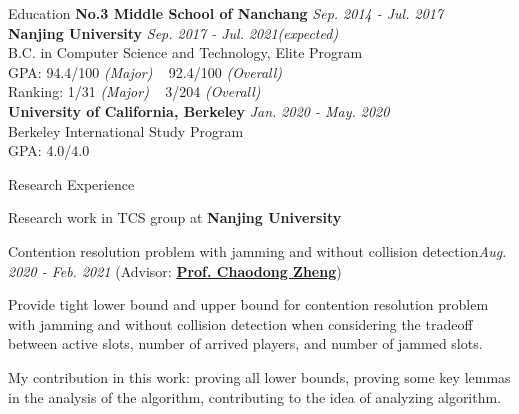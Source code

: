 \documentclass{resume} %
\begin{document}
\vspace{-2pt}
\begin{rSection}{Education}
{\bf No.3 Middle School of Nanchang} \hfill{\em Sep. 2014 - Jul. 2017}\\
{\bf Nanjing University} \hfill {\em Sep. 2017 - Jul. 2021(expected)} \\
B.C. in Computer Science and Technology, Elite Program \\
GPA: 94.4/100 {\em (Major)} ~ 92.4/100 {\em (Overall)}\\
Ranking: 1/31 {\em (Major)} ~ 3/204 {\em (Overall)}\smallskip\\
{\bf University of California, Berkeley} \hfill {\em Jan. 2020 - May. 2020} \\
Berkeley International Study Program
\smallskip\\
GPA: 4.0/4.0
\end{rSection}

\begin{rSection}{Research Experience}

{\large Research work in TCS group at {\bf Nanjing University} }

\begin{rSubsection}{Contention resolution problem with jamming and without collision detection}{\em Aug. 2020 - Feb. 2021}{ (Advisor: \href{https://chaodong.me/}{\bf Prof. Chaodong Zheng})}{}
\item Provide tight lower bound and upper bound for contention resolution problem with jamming and without collision detection when considering the tradeoff between active slots, number of arrived players, and number of jammed slots. 
\item My contribution in this work: proving all lower bounds, proving some key lemmas in the analysis of the algorithm, contributing to the idea of analyzing algorithm. 
\end{rSubsection}
\end{rSection}
\end{document}
